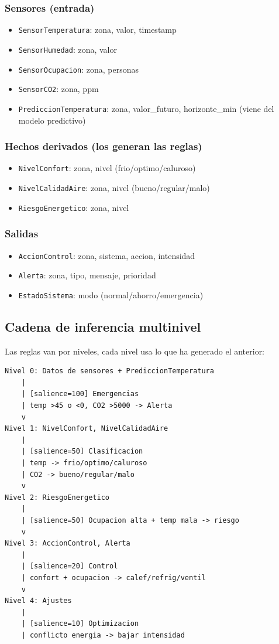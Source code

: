 \documentclass[12pt,a4paper]{article}
\begin{document}
\subsubsection*{Sensores (entrada)}
\begin{itemize}
    \item \texttt{SensorTemperatura}: zona, valor, timestamp
    \item \texttt{SensorHumedad}: zona, valor
    \item \texttt{SensorOcupacion}: zona, personas
    \item \texttt{SensorCO2}: zona, ppm
    \item \texttt{PrediccionTemperatura}: zona, valor\_futuro, horizonte\_min (viene del modelo predictivo)
\end{itemize}

\subsubsection*{Hechos derivados (los generan las reglas)}
\begin{itemize}
    \item \texttt{NivelConfort}: zona, nivel (frio/optimo/caluroso)
    \item \texttt{NivelCalidadAire}: zona, nivel (bueno/regular/malo)
    \item \texttt{RiesgoEnergetico}: zona, nivel
\end{itemize}

\subsubsection*{Salidas}
\begin{itemize}
    \item \texttt{AccionControl}: zona, sistema, accion, intensidad
    \item \texttt{Alerta}: zona, tipo, mensaje, prioridad
    \item \texttt{EstadoSistema}: modo (normal/ahorro/emergencia)
\end{itemize}

\subsection{Cadena de inferencia multinivel}

Las reglas van por niveles, cada nivel usa lo que ha generado el anterior:

\begin{lstlisting}[language={},basicstyle=\ttfamily\footnotesize]
Nivel 0: Datos de sensores + PrediccionTemperatura
    |
    | [salience=100] Emergencias
    | temp >45 o <0, CO2 >5000 -> Alerta
    v
Nivel 1: NivelConfort, NivelCalidadAire
    |
    | [salience=50] Clasificacion
    | temp -> frio/optimo/caluroso
    | CO2 -> bueno/regular/malo
    v
Nivel 2: RiesgoEnergetico
    |
    | [salience=50] Ocupacion alta + temp mala -> riesgo
    v
Nivel 3: AccionControl, Alerta
    |
    | [salience=20] Control
    | confort + ocupacion -> calef/refrig/ventil
    v
Nivel 4: Ajustes
    |
    | [salience=10] Optimizacion
    | conflicto energia -> bajar intensidad
\end{lstlisting}
\end{document}
